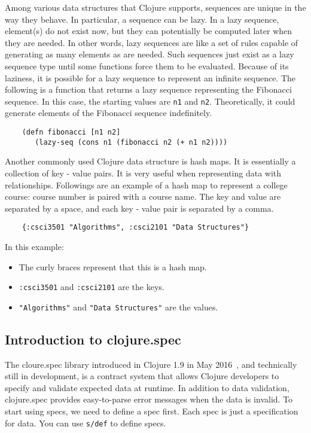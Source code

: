 \documentclass[12pt]{article}
\newcommand{\comment}[1]{{\bf \tt  {#1}}}
\newcommand{\emcomment}[1]{\textcolor{ForestGreen}{\comment{Elena: {#1}}}}
\newcommand{\tscomment}[1]{\textcolor{Teal}{\comment{Tony: {#1}}}}
\begin{document}
	Among various data structures that Clojure supports, sequences are unique in 
	the way they behave. In particular, a sequence can be lazy. In a lazy sequence, element(s) do not exist now, but they 
	can potentially be computed later when they are needed. 
	In other words, lazy sequences are like a set of rules capable of generating as many elements as are needed.
	Such sequences just exist as a lazy sequence type until some functions force them to be evaluated. Because of its laziness, it is possible 
	for a lazy sequence to represent an infinite sequence. The following is a function that returns a lazy sequence representing the 
	Fibonacci sequence. In this case, the starting values are {\tt  n1} and {\tt n2}. Theoretically, it could generate elements of the Fibonacci 
	sequence indefinitely. 
	\begin{verbatim}
	(defn fibonacci [n1 n2]
	   (lazy-seq (cons n1 (fibonacci n2 (+ n1 n2))))
	\end{verbatim}
	
	Another commonly used Clojure data structure is hash maps. It is essentially a collection of key - value pairs. 
	It is very useful when representing data with relationships. Followings are an example of a hash map to 
	represent a college course: course number is paired with a course name. 
	The key and value are separated by a space, and each key - value pair is 
	separated by a comma.
	\begin{verbatim}
	{:csci3501 "Algorithms", :csci2101 "Data Structures"}
	\end{verbatim}
	In this example:
	\begin{itemize}
	\item The curly braces represent that this is a hash map.
	\item {\tt :csci3501} and {\tt :csci2101} are the keys.
	\item {\tt "Algorithms"} and {\tt  "Data Structures"} are the values.
	\end{itemize}
	
	\subsection{Introduction to clojure.spec}\label{sec:intro-spec}
	The cloure.spec library introduced in Clojure 1.9 in May 2016~\cite{spec}, and technically still in development,  is a contract system that allows 
	Clojure developers to specify and validate expected data 
	at runtime. In addition to data validation, clojure.spec provides easy-to-parse error messages when the data is invalid. 
	To start using specs, we need to define a spec first. Each spec is just a specification for data.
	You can use \texttt{s/def} to define specs.
\end{document}
